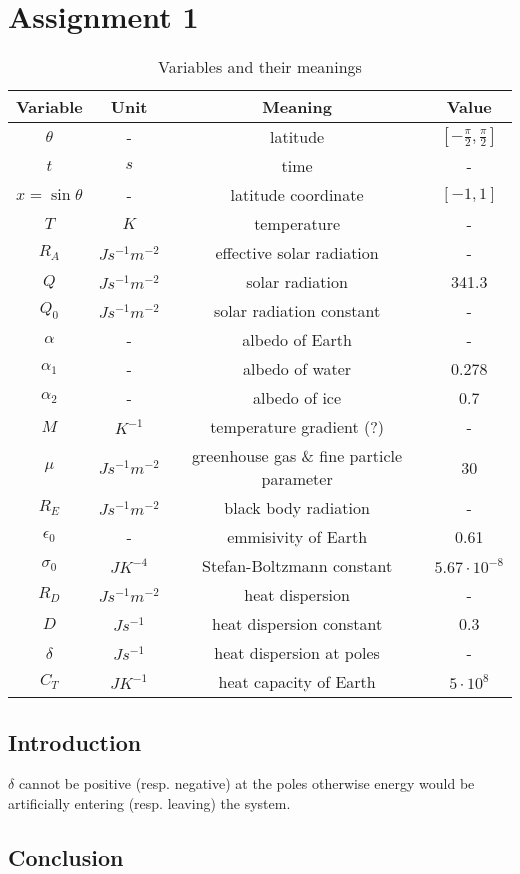 \section{Assignment 1}

\begin{table}[H]
    \centering
    \begin{tabular}{|c|c|c|c|}
        \hline
        Variable & Unit &  Meaning & Value\\
        \hline
        $\theta$ & - & latitude & $[-\frac{\pi}{2}, \frac{\pi}{2}]$\\
        $t $ & $s$ & time & -\\
        $x = \sin \theta$ & -  & latitude coordinate & $[-1, 1]$\\
        $T $ & $K$ & temperature & -\\
        $R_A $ & $J s^{-1} m^{-2}$ & effective solar radiation & - \\
        $Q $ & $J s^{-1} m^{-2}$ & solar radiation & 341.3\\
        $Q_0 $ & $J s^{-1} m^{-2}$ & solar radiation constant & -\\
        $\alpha$ & - & albedo of Earth & -\\
        $\alpha_1$ & - & albedo of water & 0.278\\
        $\alpha_2$ & - & albedo of ice & 0.7\\
        $M$ & $K^{-1}$ & temperature gradient (?) & -\\
        $\mu $ & $J s^{-1} m^{-2}$ & greenhouse gas \& fine particle parameter & 30\\
        $R_E $ & $J s^{-1} m^{-2}$ & black body radiation & -\\
        $\epsilon_0$ & - & emmisivity of Earth & 0.61\\
        $\sigma_0 $ & $J K^{-4}$ & Stefan-Boltzmann constant & $5.67 \cdot 10^{-8}$\\
        $R_D $ & $J s^{-1} m^{-2}$ & heat dispersion & -\\
        $D $ & $J s^{-1} $ & heat dispersion constant & 0.3\\
        $\delta $ & $J s^{-1}$ & heat dispersion at poles & -\\
        $C_T $ & $J K^{-1}$  & heat capacity of Earth & $5 \cdot 10^{8}$\\
        \hline
    \end{tabular}
    \caption{Variables and their meanings}
    \label{tab:vars}
\end{table}

\subsection{Introduction}
$\delta$ cannot be positive (resp. negative) at the poles otherwise energy would be
artificially entering (resp. leaving) the system.

\subsection{Conclusion}